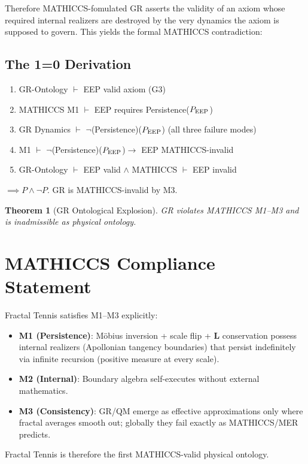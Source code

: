 \documentclass[11pt,a4paper]{article}
\newtheorem{theorem}{Theorem}
\begin{document}
Therefore MATHICCS-fomulated GR asserts the validity of an axiom whose required internal realizers are destroyed by the very dynamics the axiom is supposed to govern. This yields the formal MATHICCS contradiction:

\subsection{The 1=0 Derivation}
\begin{enumerate}
\item GR-Ontology $\vdash$ EEP valid axiom (G3)
\item MATHICCS M1 $\vdash$ EEP requires Persistence($P_{\rm EEP}$)
\item GR Dynamics $\vdash$ $\neg$(Persistence)($P_{\rm EEP}$) (all three failure modes)
\item M1 $\vdash$ $\neg$(Persistence)($P_{\rm EEP}$)$\to$ EEP MATHICCS-invalid
\item GR-Ontology $\vdash$ EEP valid $\land$ MATHICCS $\vdash$ EEP invalid
\end{enumerate}
$\implies P \land \neg P$. GR is MATHICCS-invalid by M3.

\begin{theorem}[GR Ontological Explosion]
GR violates MATHICCS M1--M3 and is inadmissible as physical ontology.
\end{theorem}

\section{MATHICCS Compliance Statement}
Fractal Tennis satisfies M1--M3 explicitly:

\begin{itemize}
\item \textbf{M1 (Persistence)}: M\"obius inversion + scale flip + $\mathbf{L}$ conservation possess internal realizers (Apollonian tangency boundaries) that persist indefinitely via infinite recursion (positive measure at every scale).
\item \textbf{M2 (Internal)}: Boundary algebra self-executes without external mathematics.
\item \textbf{M3 (Consistency)}: GR/QM emerge as effective approximations only where fractal averages smooth out; globally they fail exactly as MATHICCS/MER predicts.
\end{itemize}

Fractal Tennis is therefore the first MATHICCS-valid physical ontology.
\end{document}
